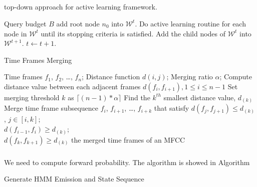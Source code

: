 \documentclass{article}
\begin{document}
\subsection{}
\begin{algorithm}
\caption{top-down approach for active learning framework.}
\label{alg:topdown}
\begin{algorithmic}
    \REQUIRE Query budget $B$
    \REPEAT
        \STATE add root node $n_0$ into $\mathcal{W}^{t}$.
        \REPEAT
            \STATE Do active learning routine for each node in $\mathcal{W}^{t}$ until its stopping criteria is satisfied.
            \STATE Add the child nodes of $\mathcal{W}^{t}$ into $\mathcal{W}^{t+1}$.
            \STATE $t \leftarrow t + 1$.
\end{algorithmic}
\end{algorithm}

\begin{algorithm}
  \caption{Time Frames Merging}
  \label{alg:time frame mergence}
  \begin{algorithmic}
    \REQUIRE
    Time frames $f_1$, $f_2$, \ldots, $f_n$; Distance function $d(i,j)$; Merging ratio $\alpha$;
     \STATE Compute distance value between each adjacent frames $d(f_i,f_{i+1}),1\leq i \leq n-1$
     \STATE Set merging threshold $k$ as $\lceil (n-1)* \alpha \rceil$
     \STATE Find the $k^{th}$ smallest distance value, $d_{(k)}$
     \STATE Merge time frame subsequence $f_i$, $f_{i+1}$, \ldots, $f_{i+k}$ 
     that satisfy $d(f_j,f_{j+1}) \leq d_{(k)}$, $j\in[i,k]$;\\
              \hspace{9mm}     $d(f_{i-1},f_i) \geq d_{(k)}$;\\
               \hspace{9mm}    $d(f_k,f_{k+1}) \geq d_{(k)}$
     \STATE \Return the merged time frames of an MFCC
  \end{algorithmic}
\end{algorithm}

\subsubsection{}
We need to compute forward probability. The algorithm is showed in Algorithm
\begin{algorithm}
\SetAlgoLined
{}
\caption{Generate HMM Emission and State Sequence}
\label{alg:p11}
\end{algorithm}
\end{document}
